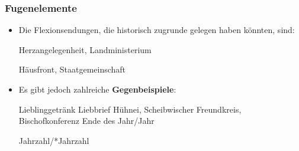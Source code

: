\begin{frame}
\frametitle{Fugenelemente}

\begin{itemize}
	\item Die Flexionsendungen, die historisch zugrunde gelegen haben könnten, sind:
	
		\settowidth{} 
		\ea Herzangelegenheit, Landministerium

		\ex Häusfront, Staatgemeinschaft
		\jambox{[Plural]}
		\z 

\pause 
	
	\item Es gibt jedoch zahlreiche \textbf{Gegenbeispiele}:
	
	\settowidth{} 
	\eal 
		\ex Lieblinggetränk 
		\ex Liebbrief 
		\ex Hühnei, Scheibwischer 
		\ex Freundkreis, Bischofkonferenz 
		\ex Ende des Jahr/Jahr \jambox{[Genitivalternation]}
		
		\vs Jahrzahl/*Jahrzahl  
	\zl
		 
\end{itemize}

\end{frame}


